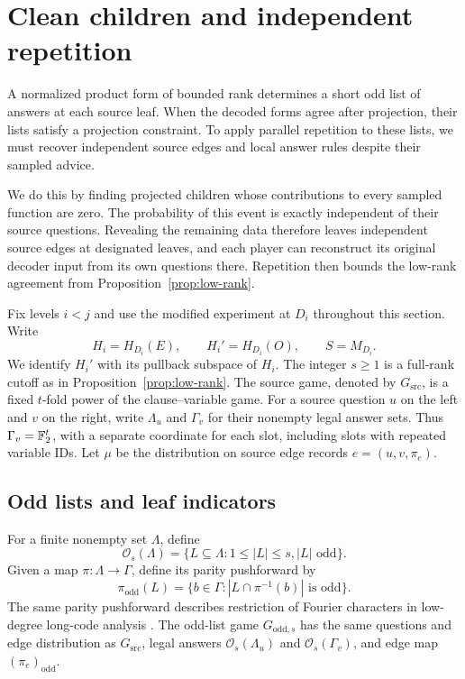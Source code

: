 \section{Clean children and independent repetition}
\label{sec:clean}

A normalized product form of bounded rank determines a short odd list
of answers at each source leaf.  When the decoded forms agree after
projection, their lists satisfy a projection constraint.  To apply
parallel repetition to these lists, we must recover independent source
edges and local answer rules despite their sampled advice.

We do this by finding projected children whose contributions to every
sampled function are zero.  The probability of this event is exactly
independent of their source questions.  Revealing the remaining data
therefore leaves independent source edges at designated leaves, and
each player can reconstruct its original decoder input from its own
questions there.  Repetition then bounds the low-rank agreement from
Proposition~\ref{prop:low-rank}.

Fix levels $i<j$ and use the modified experiment at $D_i$ throughout
this section.  Write
\[
 H_i=H_{D_i}(E),\qquad H_i'=H_{D_i}(O),\qquad S=M_{D_i}.
\]
We identify $H_i'$ with its pullback subspace of $H_i$.  The integer
$s\ge1$ is a full-rank cutoff as in
Proposition~\ref{prop:low-rank}.  The source game, denoted by
$G_{\mathrm{src}}$, is a fixed $t$-fold power of the clause--variable
game.  For a source question $u$ on the left and $v$ on the right,
write $\Lambda_u$ and $\Gamma_v$ for their nonempty legal answer sets.
Thus $\Gamma_v=\mathbb F_2^t$, with a separate coordinate for each slot,
including slots with repeated variable IDs.  Let $\mu$ be the
distribution on source edge records $e=(u,v,\pi_e)$.

\subsection{Odd lists and leaf indicators}

For a finite nonempty set $\Lambda$, define
\[
 \mathcal O_s(\Lambda)
 =\{L\subseteq\Lambda:1\le |L|\le s, |L|\text{ odd}\}.
\]
Given a map $\pi:\Lambda\to\Gamma$, define its parity pushforward by
\begin{equation}
 \pi_{\mathrm{odd}}(L)
 =\{b\in\Gamma:|L\cap\pi^{-1}(b)|\text{ is odd}\}.
 \label{eq:clean-parity-map}
\end{equation}
The same parity pushforward describes restriction of Fourier characters
in low-degree long-code analysis
\cite[Section~2.3, Equation~(1), ECCC version]{DinurGuruswami2015}.
The odd-list game $G_{\mathrm{odd},s}$ has the same questions and edge
distribution as $G_{\mathrm{src}}$, legal answers
$\mathcal O_s(\Lambda_u)$ and $\mathcal O_s(\Gamma_v)$, and edge map
$(\pi_e)_{\mathrm{odd}}$.


